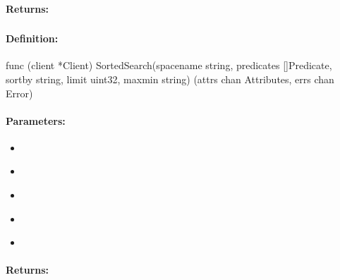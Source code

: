 \paragraph{Returns:}


\pagebreak
\subsubsection{}
\label{api:Go:SortedSearch}


\paragraph{Definition:}
\begin{gocode}
func (client *Client) SortedSearch(spacename string, predicates []Predicate, sortby string, limit uint32, maxmin string) (attrs chan Attributes, errs chan Error)
\end{gocode}

\paragraph{Parameters:}
\begin{itemize}[noitemsep]
\item {}\\

\item {}\\

\item {}\\

\item {}\\

\item {}\\

\end{itemize}

\paragraph{Returns:}


